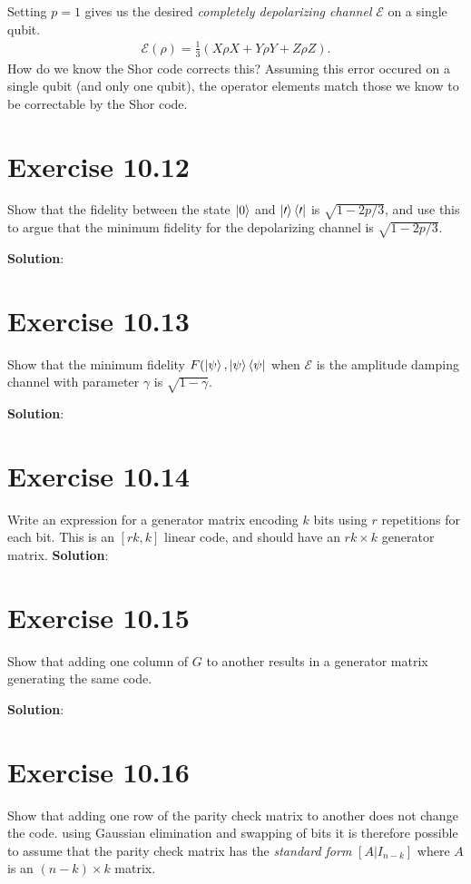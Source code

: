 \documentclass{book}
\newcommand{\mc}[1]{\mathcal{#1}}
\begin{document}
    Setting $p = 1$ gives us the desired \emph{completely depolarizing channel} $\mc{E}$ on a single qubit.
    \begin{align}
        \mc{E}(\rho) = \frac{1}{3} (X \rho X + Y \rho Y + Z\rho Z).
    \end{align}
    How do we know the Shor code corrects this? Assuming this error occured on a single qubit (and only one qubit), the operator elements match those we know to be correctable by the Shor code. 

\section*{Exercise 10.12}
    Show that the fidelity between the state $\ket{0}$ and $\mc{\ket{0}\bra{0}}$ is $\sqrt{1-2p/3}$, and use this to argue that the minimum fidelity for the depolarizing channel is $\sqrt{1-2p/3}$.

    \textbf{Solution}:

\section*{Exercise 10.13}
    Show that the minimum fidelity $F(\ket{\psi}, \mc{\ket{\psi}\bra{\psi}}$ when $\mc{E}$ is the amplitude damping channel with parameter $\gamma$ is $\sqrt{1-\gamma}$.

    \textbf{Solution}:

\section*{Exercise 10.14}
    Write an expression for a generator matrix encoding $k$ bits using $r$ repetitions for each bit. This is an $[rk, k]$ linear code, and should have an $rk\times k$ generator matrix.
    \textbf{Solution}:

\section*{Exercise 10.15}
    Show that adding one column of $G$ to another results in a generator matrix generating the same code.

    \textbf{Solution}:

\section*{Exercise 10.16}
    Show that adding one row of the parity check matrix to another does not change the code. using Gaussian elimination and swapping of bits it is therefore possible to assume that the parity check matrix has the \emph{standard form} $[A\vert I_{n-k}]$ where $A$ is an $(n-k)\times k$ matrix.
\end{document}
